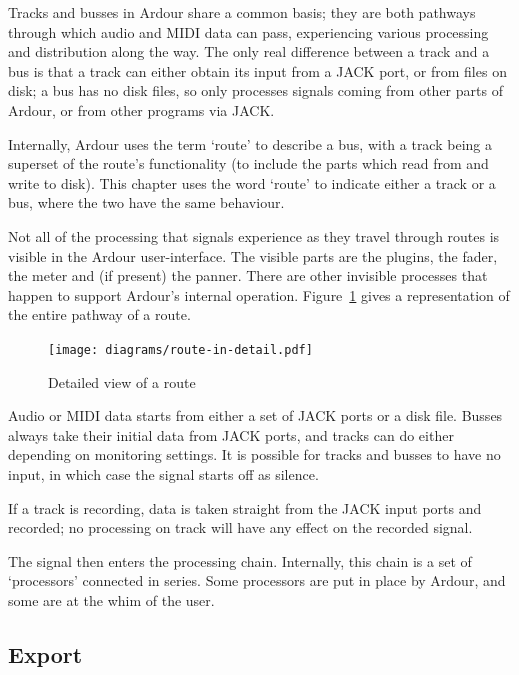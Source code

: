 \documentclass[10pt,a4paper]{book}
\begin{document}
{Tracks and busses in Ardour share a common basis; they are both
pathways through which audio and MIDI data can pass, experiencing
various processing and distribution along the way.  The only real
difference between a track and a bus is that a track can either obtain
its input from a JACK port, or from files on disk; a bus has no disk
files, so only processes signals coming from other parts of Ardour, or
from other programs via JACK\@.

Internally, Ardour uses the term `route' to describe a bus, with a
track being a superset of the route's functionality (to include the
parts which read from and write to disk).  This chapter uses the word
`route' to indicate either a track or a bus, where the two have the
same behaviour.

Not all of the processing that signals experience as they travel
through routes is visible in the Ardour user-interface. The visible parts
are the plugins, the fader, the meter and (if present) the panner.
There are other invisible processes that happen to support Ardour's
internal operation.  Figure~\ref{fig:route-in-detail} gives a
representation of the entire pathway of a route.

\begin{figure}[ht]
\begin{center}
\texttt{[image: diagrams/route-in-detail.pdf]}
\end{center}
\caption{Detailed view of a route}
\label{fig:route-in-detail}
\end{figure}

Audio or MIDI data starts from either a set of JACK ports or a disk
file.  Busses always take their initial data from JACK ports, and
tracks can do either depending on monitoring settings.  It is possible
for tracks and busses to have no input, in which case the signal
starts off as silence.

If a track is recording, data is taken straight from the JACK input
ports and recorded; no processing on track will have any effect on the
recorded signal.

The signal then enters the processing chain.  Internally, this chain
is a set of `processors' connected in series.  Some processors are put
in place by Ardour, and some are at the whim of the user.

\subsection{Export}

}
\end{document}
